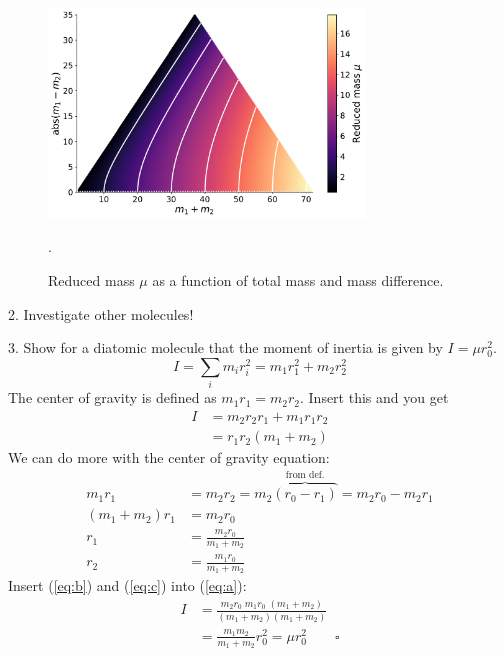 \documentclass[paper=a4, fontsize=11pt]{scrartcl}
\begin{document}
\begin{figure}[h]
  \centering
  \includegraphics[width=0.75\textwidth]{plots/reduced_mass.pdf}
  \caption{Reduced mass $\mu$ as a function of total mass and mass difference.}
  \label{fig:reduced_mass}.
\end{figure}

2. Investigate other molecules!

3. Show for a diatomic molecule that the moment of inertia is given by $I = \mu r_0^2$.
\begin{equation*}
  I = \sum_i m_i r_i^2 = m_1 r_1^2 + m_2 r_2^2
\end{equation*}
The center of gravity is defined as $m_1 r_1 = m_2 r_2$. Insert this and you get
\begin{align}
  I &= m_2 r_2 r_1 + m_1 r_1 r_2 \nonumber\\
    &= r_1 r_2 (m_1 + m_2) \label{eq:a}
\end{align}
We can do more with the center of gravity equation:
\begin{align}
  m_1 r_1 &= m_2 r_2 = m_2 \overbrace{(r_0 - r_1)}^\text{from def.} = m_2 r_0 - m_2 r_1 \nonumber\\
  (m_1 + m_2) r_1 &= m_2 r_0 \nonumber\\
  r_1 &= \frac{m_2 r_0}{m_1 + m_2} \label{eq:b}\\
  r_2 &= \frac{m_1 r_0}{m_1 + m_2} \label{eq:c}
\end{align}
Insert (\ref{eq:b}) and (\ref{eq:c}) into (\ref{eq:a}):
\begin{align*}
  I &= \frac{m_2r_0 \; m_1r_0 \; (m_1 + m_2)}{(m_1 + m_2)(m_1 + m_2)} \\
    &= \frac{m_1m_2}{m_1 + m_2} r_0^2 = \mu r_0^2 \qquad\square
\end{align*}
\end{document}
